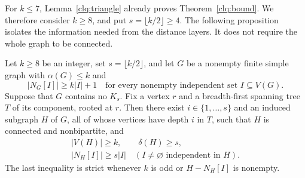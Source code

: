 For \(k\le7\), Lemma~\ref{clq:triangle} already proves
Theorem~\ref{clq:bound}.  We therefore consider \(k\ge8\), and put
\(s=\lfloor k/2\rfloor\ge4\).  The following proposition isolates
the information needed from the distance layers.  It does not require
the whole graph to be connected.

\begin{proposition}\label{clq:layer-interface}
Let \(k\ge8\) be an integer, set \(s=\lfloor k/2\rfloor\), and let \(G\) be a
nonempty finite simple graph with \(\alpha(G)\le k\) and
\[
 |N_G[I]|\ge k|I|+1
 \quad\text{for every nonempty independent set }I\subseteq V(G).
\]
Suppose that \(G\) contains no \(K_s\).  Fix a vertex \(r\) and a
breadth-first spanning tree \(T\) of its component, rooted at \(r\).
Then there exist \(i\in\{1,\ldots,s\}\) and an induced subgraph \(H\)
of \(G\), all of whose vertices have depth \(i\) in \(T\), such that
\(H\) is connected and nonbipartite, and
\begin{equation}\label{clq:H-properties}
 \begin{gathered}
 |V(H)|\ge k,\qquad \delta(H)\ge s,\\
 |N_H[I]|\ge s|I|
 \quad(I\ne\varnothing\text{ independent in }H).
 \end{gathered}
\end{equation}
The last inequality is strict whenever \(k\) is odd or
\(H-N_H[I]\) is nonempty.
\end{proposition}

